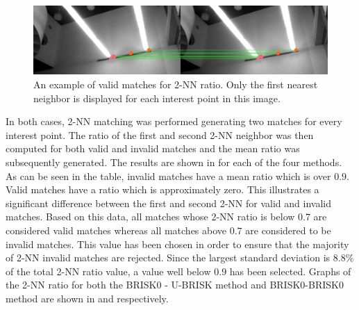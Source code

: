 \documentclass{report}
\begin{document}
 \begin{figure}%
  \centering
    \includegraphics[width=1.0\textwidth]{../Drawings/knnRatio/KNN_ratio.jpg}
    \caption{An example of valid matches for 2-NN ratio. Only the first nearest neighbor is displayed for each interest point in this image.} 
    \label{fig:validKnn}
 \end{figure}

In both cases, 2-NN matching was performed generating two matches for every interest point. The ratio of the first and second 2-NN neighbor was then computed for both valid and invalid matches and the mean ratio was subsequently generated. The results are shown in  for each of the four methods. As can be seen in the table, invalid matches have a mean ratio which is over $0.9$. Valid matches have a ratio which is approximately zero. This illustrates a significant difference between the first and second 2-NN for valid and invalid matches. Based on this data, all matches whose 2-NN ratio is below $0.7$ are considered valid matches whereas all matches above $0.7$ are considered to be invalid matches. This value has been chosen in order to ensure that the majority of 2-NN invalid matches are rejected. Since the largest standard deviation is $8.8\%$ of the total 2-NN ratio value, a value well below $0.9$ has been selected. Graphs of the 2-NN ratio for both the BRISK0 - U-BRISK method and BRISK0-BRISK0 method are shown in  and  respectively. \\
\end{document}

